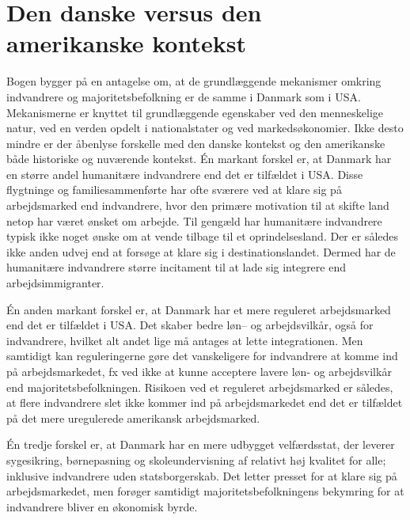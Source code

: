 \documentclass[
]{book}
\begin{document}
\section{Den danske versus den amerikanske kontekst}\label{den-danske-versus-den-amerikanske-kontekst}

Bogen bygger på en antagelse om, at de grundlæggende mekanismer omkring indvandrere og majoritetsbefolkning er de samme i Danmark som i USA. Mekanismerne er knyttet til grundlæggende egenskaber ved den menneskelige natur, ved en verden opdelt i nationalstater og ved markedsøkonomier. Ikke desto mindre er der åbenlyse forskelle med den danske kontekst og den amerikanske både historiske og nuværende kontekst. Én markant forskel er, at Danmark har en større andel humanitære indvandrere end det er tilfældet i USA. Disse flygtninge og familiesammenførte har ofte sværere ved at klare sig på arbejdsmarked end indvandrere, hvor den primære motivation til at skifte land netop har været ønsket om arbejde. Til gengæld har humanitære indvandrere typisk ikke noget ønske om at vende tilbage til et oprindelsesland. Der er således ikke anden udvej end at forsøge at klare sig i destinationslandet. Dermed har de humanitære indvandrere større incitament til at lade sig integrere end arbejdsimmigranter.

Én anden markant forskel er, at Danmark har et mere reguleret arbejdsmarked end det er tilfældet i USA. Det skaber bedre løn-- og arbejdsvilkår, også for indvandrere, hvilket alt andet lige må antages at lette integrationen. Men samtidigt kan reguleringerne gøre det vanskeligere for indvandrere at komme ind på arbejdsmarkedet, fx ved ikke at kunne acceptere lavere løn- og arbejdsvilkår end majoritetsbefolkningen. Risikoen ved et reguleret arbejdsmarked er således, at flere indvandrere slet ikke kommer ind på arbejdsmarkedet end det er tilfældet på det mere uregulerede amerikansk arbejdsmarked.

Én tredje forskel er, at Danmark har en mere udbygget velfærdsstat, der leverer sygesikring, børnepasning og skoleundervisning af relativt høj kvalitet for alle; inklusive indvandrere uden statsborgerskab. Det letter presset for at klare sig på arbejdsmarkedet, men forøger samtidigt majoritetsbefolkningens bekymring for at indvandrere bliver en økonomisk byrde.
\end{document}
